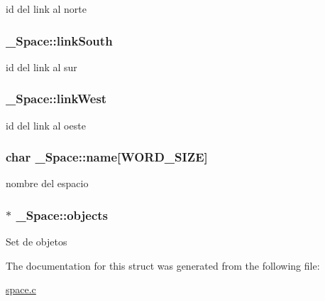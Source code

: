 id del link al norte \hypertarget{struct__Space_a642c37093a6ccc0203a655c3fc0a93d3}{
\subsubsection[{link\+South}]{ \+\_\+\+Space\+::link\+South}}\label{struct__Space_a642c37093a6ccc0203a655c3fc0a93d3}
id del link al sur \hypertarget{struct__Space_aaa6f5fa10a67afc466e3b272099dc398}{
\subsubsection[{link\+West}]{ \+\_\+\+Space\+::link\+West}}\label{struct__Space_aaa6f5fa10a67afc466e3b272099dc398}
id del link al oeste \hypertarget{struct__Space_a4e8775f2ba9ae19392f9942dbb5f5ec0}{
\subsubsection[{name}]{\setlength{\rightskip}{0pt plus 5cm}char \+\_\+\+Space\+::name\mbox{[}{\bf W\+O\+R\+D\+\_\+\+S\+I\+Z\+E}\mbox{]}}}\label{struct__Space_a4e8775f2ba9ae19392f9942dbb5f5ec0}
nombre del espacio \hypertarget{struct__Space_a661ed8b0fc8085b6db70188aa5085625}{
\subsubsection[{objects}]{$\ast$ \+\_\+\+Space\+::objects}}\label{struct__Space_a661ed8b0fc8085b6db70188aa5085625}
Set de objetos 

The documentation for this struct was generated from the following file\+:\begin{DoxyCompactItemize}
\item 
\hyperlink{space_8c}{space.\+c}\end{DoxyCompactItemize}
